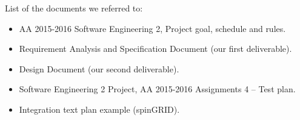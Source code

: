 List of the documents we referred to:
\begin{itemize}
    \item AA 2015-2016 Software Engineering 2, Project goal, schedule and rules.
    \item Requirement Analysis and Specification Document (our first deliverable).
    \item Design Document (our second deliverable).
    \item Software Engineering 2 Project, AA 2015-2016 Assignments 4 – Test plan.
    \item Integration text plan example (spinGRID).
\end{itemize}
